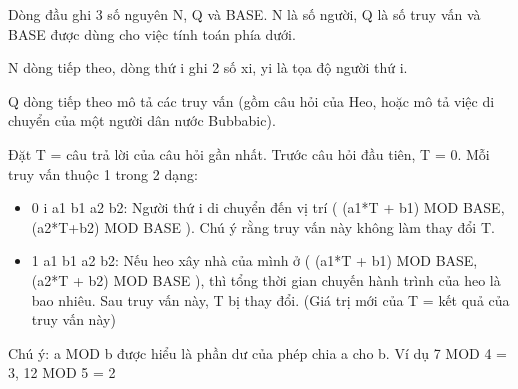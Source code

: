Dòng đầu ghi 3 số nguyên N, Q và BASE. N là số người, Q là số truy vấn và BASE được dùng cho việc tính toán phía dưới.  

   N dòng tiếp theo, dòng thứ i ghi 2 số xi, yi là tọa độ người thứ i.  

   Q dòng tiếp theo mô tả các truy vấn (gồm câu hỏi của Heo, hoặc mô tả việc di chuyển của một người dân nước Bubbabic).  

   Đặt T = câu trả lời của câu hỏi gần nhất. Trước câu hỏi đầu tiên, T = 0. Mỗi truy vấn thuộc 1 trong 2 dạng:  
\begin{itemize}
	\item     0 i a1 b1 a2 b2: Người thứ i di chuyển đến vị trí ( (a1*T + b1) MOD BASE, (a2*T+b2) MOD BASE ). Chú ý rằng truy vấn này không làm thay đổi T.   
	\item     1 a1 b1 a2 b2: Nếu heo xây nhà của mình ở ( (a1*T + b1) MOD BASE, (a2*T + b2) MOD BASE ), thì tổng thời gian chuyến hành trình của heo là bao nhiêu. Sau truy vấn này, T bị thay đổi. (Giá trị mới của T = kết quả của truy vấn này)   
\end{itemize}

   Chú ý: a MOD b được hiểu là phần dư của phép chia a cho b. Ví dụ 7 MOD 4 = 3, 12 MOD 5 = 2